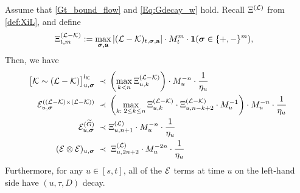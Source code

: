 \begin{lemma}\label{lem_BcalE} 
Assume  that \eqref{Gt_bound_flow} and \eqref{Eq:Gdecay_w} hold.  
Recall $\Xi^{({\cal L})}$ from \eqref{def:XiL}, and define
\begin{align}\label{def:XIL-K}
     \Xi^{({\cal L}-{\cal K})}_{t, m} &:= \max_{\boldsymbol{\sigma}, \textbf{a}} \left|({\cal L}-{\cal K})_{t, \boldsymbol{\sigma}, \textbf{a}} \right|\cdot M_{t}^{m} \cdot {\bf 1}(\boldsymbol{\sigma} \in \{+, -\}^m),
\end{align}Then, we have
\begin{align}\label{CalEbwXi}
\big[\mathcal{K} \sim(\mathcal{L}-\mathcal{K})\big]_{u, \boldsymbol{\sigma}}^{l_{\mathcal{K}}}
   \; \prec \; &
   \left( \max_{k<n }\Xi^{(\cal L-\cal K)}_{u,k}\right)\cdot M_{u}^{-n }\cdot \frac{1}{\eta_u}   
   \nonumber \\
    \mathcal{E}_{u, \boldsymbol{\sigma}}^{((\mathcal{L} - \mathcal{K}) \times (\mathcal{L} - \mathcal{K}))}
    \; \prec \; &
   \left( \max_{k:\;2\le k\le n }\Xi^{(\cal L-\cal K)}_{u,k}\cdot \Xi^{(\cal L-\cal K)}_{u,n-k+2}\cdot M_{u}^{-1}\right)\cdot M_{u}^{-n }\cdot \frac{1}{\eta_u}  
  \nonumber \\  \mathcal{E}_{u, \boldsymbol{\sigma}}^{(\widetilde{G})}
 \; \prec \; &
     \Xi^{(\cal L)}_{u,n+1} \cdot M_{u}^{-n }\cdot \frac{1}{\eta_u}    
  \nonumber \\   
(\mathcal{E} \otimes \mathcal{E}) _{u, \boldsymbol{\sigma}}
\; \prec \; &  \; \Xi^{(\cal L)}_{u, {2n+2}}\cdot   M_{u}^{-2n } \cdot \frac1{\eta_u}
\end{align}
Furthermore, for any $u\in[s,t]$, all of the $\cal E$ terms at time $u$ on the left-hand side have $(u, \tau, D)$ decay.  
 \end{lemma}
 
